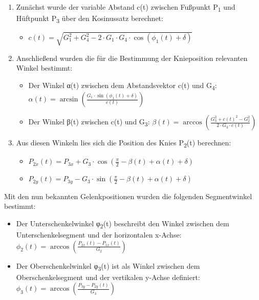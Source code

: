 \documentclass[
  letterpaper,
  DIV=11]{scrartcl}
\providecommand{\tightlist}{%
  \setlength{\itemsep}{0pt}\setlength{\parskip}{0pt}}\usepackage{longtable,booktabs,array}
\begin{document}
\begin{enumerate}
\def\labelenumi{\arabic{enumi}.}
\tightlist
\item
  Zunächst wurde der variable Abstand c(t) zwischen Fußpunkt
  P\textsubscript{1} und Hüftpunkt P\textsubscript{3} über den
  Kosinussatz berechnet:

  \begin{itemize}
  \tightlist
  \item
    \(c(t) = \sqrt{G_1^2 + G_4^2 - 2 \cdot G_1 \cdot G_4 \cdot \cos(\phi_1(t) + \delta)}\)
  \end{itemize}
\item
  Anschließend wurden die für die Bestimmung der Knieposition relevanten
  Winkel bestimmt:

  \begin{itemize}
  \tightlist
  \item
    Der Winkel α(t) zwischen dem Abstandsvektor c(t) und
    G\textsubscript{4}:
    \(\alpha(t) = \arcsin(\frac{G_1 \cdot \sin(\phi_1(t) + \delta)}{c(t)})\)
  \item
    Der Winkel β(t) zwischen c(t) und G\textsubscript{3}:
    \(\beta(t) = \arccos(\frac{G_3^2 + c(t)^2 - G_2^2}{2 \cdot G_3 \cdot c(t)})\)
  \end{itemize}
\item
  Aus diesen Winkeln lies sich die Position des Knies
  P\textsubscript{2}(t) berechnen:

  \begin{itemize}
  \tightlist
  \item
    \(P_{2x}(t) = P_{3x} + G_3 \cdot \cos(\frac{\pi}{2} - \beta(t) + \alpha(t) + \delta)\)
  \item
    \(P_{2y}(t) = P_{3y} - G_3 \cdot \sin(\frac{\pi}{2} - \beta(t) + \alpha(t) + \delta)\)
  \end{itemize}
\end{enumerate}

Mit den nun bekannten Gelenkpositionen wurden die folgenden
Segmentwinkel bestimmt:

\begin{itemize}
\tightlist
\item
  Der Unterschenkelwinkel φ\textsubscript{2}(t) beschreibt den Winkel
  zwischen dem Unterschenkelsegment und der horizontalen x-Achse:
  \(\phi_2(t) = \arccos(\frac{P_{2x}(t) - P_{1x}(t)}{G_2})\)
\item
  Der Oberschenkelwinkel φ\textsubscript{3}(t) ist als Winkel zwischen
  dem Oberschenkelsegment und der vertikalen y-Achse definiert:
  \(\phi_3(t) = \arccos(\frac{P_{3y} - P_{2y}(t)}{G_3})\)
\end{itemize}
\end{document}
